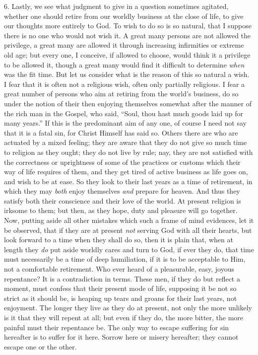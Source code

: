 6. Lastly, we see what judgment to give in a question sometimes
agitated, whether one should retire from our worldly business at the
close of life, to give our thoughts more entirely to God. To wish to
do so is so natural, that I suppose there is no one who would not wish
it. A great many persons are not allowed the privilege, a great many
are allowed it through increasing infirmities or extreme old age; but
every one, I conceive, if allowed to choose, would think it a
privilege to be allowed it, though a great many would find it
difficult to determine \emph{when} was the fit time. But let us consider what
is the reason of this so natural a wish. I fear that it is often not a
religious wish, often only partially religious. I fear a great number
of persons who aim at retiring from the world's business, do so under
the notion of their then enjoying themselves somewhat after the manner
of the rich man in the Gospel, who said, ``Soul, thou hast much
goods laid up for many years.'' If this is the predominant aim of
any one, of course I need not say that it is a fatal sin, for Christ
Himself has said so. Others there are who are actuated by a mixed
feeling; they are aware that they do not give so much time to religion
as they ought; they do not live by rule; nay, they are not satisfied
with the correctness or uprightness of some of the practices or
customs which their way of life requires of them, and they get tired
of active business as life goes on, and wish to be at ease. So they
look to their last years as a time of retirement, in which they may \emph{both}
enjoy themselves \emph{and} prepare for heaven. And thus they satisfy
both their conscience and their love of the world. At present religion
is irksome to them; but then, as they hope, duty and pleasure will go
together. Now, putting aside all other mistakes which such a frame of
mind evidences, let it be observed, that if they are at present \emph{not}
serving God with all their hearts, but look forward to a time when
they shall do so, then it is plain that, when at length they \emph{do}
put aside worldly cares and turn to God, if ever they do, that time
must necessarily be a time of deep humiliation, if it is to be
acceptable to Him, not a comfortable retirement. Who ever heard of a
pleasurable, easy, joyous repentance? It is a contradiction in terms.
These men, if they do but reflect a moment, must confess that their
present mode of life, supposing it be not so strict as it should be,
is heaping up tears and groans for their last years, not enjoyment.
The longer they live as they do at present, not only the more unlikely
is it that they will repent at all; but even if they do, the more
bitter, the more painful must their repentance be. The only way to
escape suffering for sin hereafter is to suffer for it here. Sorrow
here or misery hereafter; they cannot escape one or the other.


